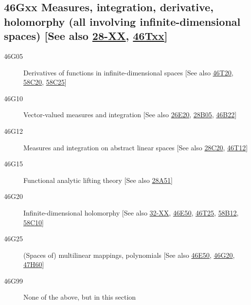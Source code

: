\documentclass[letterpaper]{article}
\begin{document}
\subsection*{46Gxx  Measures, integration, derivative, holomorphy (all involving infinite-\newline dimensional spaces) [See also \hyperref[28-XX]{28-XX}, \hyperref[46Txx]{46Txx}]}\label{46Gxx}
\begin{description}  
\item [46G05]\label{46G05} Derivatives of functions in infinite-dimensional spaces [See also \hyperref[46T20]{46T20}, \hyperref[58C20]{58C20}, \hyperref[58C25]{58C25}]
\item [46G10]\label{46G10} Vector-valued measures and integration [See also \hyperref[26E20]{26E20}, \hyperref[28B05]{28B05}, \hyperref[46B22]{46B22}]
\item [46G12]\label{46G12} Measures and integration on abstract linear spaces [See also \hyperref[28C20]{28C20}, \hyperref[46T12]{46T12}]
\item [46G15]\label{46G15} Functional analytic lifting theory [See also \hyperref[28A51]{28A51}]
\item [46G20]\label{46G20} Infinite-dimensional holomorphy [See also \hyperref[32-XX]{32-XX}, \hyperref[46E50]{46E50}, \hyperref[46T25]{46T25}, \hyperref[58B12]{58B12}, \hyperref[58C10]{58C10}]
\item [46G25]\label{46G25} (Spaces of) multilinear mappings, polynomials [See also \hyperref[46E50]{46E50}, \hyperref[46G20]{46G20}, \hyperref[47H60]{47H60}]
\item [46G99]\label{46G99} None of the above, but in this section
\end{description}
\end{document}
